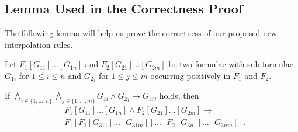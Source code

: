 \begin{techreport}

\subsection{Lemma Used in the Correctness Proof}

The following lemma will help us prove the correctness of our proposed new 
interpolation rules.


\begin{lemma}
  Let $F_1[G_{11}]\dots[G_{1n}]$ and $F_2[G_{21}]\dots[G_{2m}]$ be two formulae with sub-formulae $G_{1i}$ for $1 \leq i \leq n$ and $G_{2j}$ for $1 \leq j \leq m$ occurring positively in $F_1$ and $F_2$.

    If $\bigwedge_{i\in \{1,\dots,n\}} \bigwedge_{j\in \{1,\dots,m\}} G_{1i} \land G_{2j} \rightarrow G_{3ij}$ 
    holds, then
    \begin{align*}
      &F_1[G_{11}]\dots [G_{1n}] \land F_2[G_{21}]\dots [G_{2m}] 
      \rightarrow\\& F_1[F_2[G_{311}]\dots[G_{31m}]]\dots
                   [F_2[G_{3n1}]\dots[G_{3nm}]].
    \end{align*}


\end{lemma}
\end{techreport}
